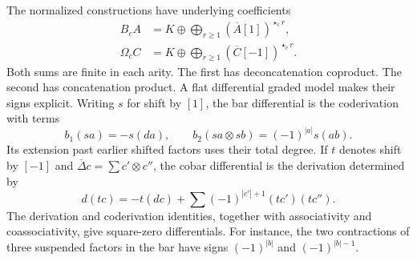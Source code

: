 The normalized constructions have underlying coefficients
\begin{align}
 B_c A&=K\oplus\bigoplus_{r\geq1}
              (\overline A[1])^{\star_c r},
              \label{eq:words-bar}\\
 \Omega_c C&=K\oplus\bigoplus_{r\geq1}
              (\overline C[-1])^{\star_c r}.
              \label{eq:words-cobar}
\end{align}
Both sums are finite in each arity.  The first has deconcatenation
coproduct.  The second has concatenation product.  A flat differential
graded model makes their signs explicit.  Writing \(s\) for shift
by \([1]\), the bar differential is the coderivation with terms
\begin{equation}
 b_1(sa)=-s(da),\qquad
 b_2(sa\otimes sb)=(-1)^{|a|}s(ab).
 \label{eq:words-bar-signs}
\end{equation}
Its extension past earlier shifted factors uses their total degree.
If \(t\) denotes shift by \([-1]\) and
\(\overline\Delta c=\sum c'\otimes c''\), the cobar differential
is the derivation determined by
\begin{equation}
 d(tc)=-t(dc)+
       \sum(-1)^{|c'|+1}(tc')(tc'').
 \label{eq:words-cobar-signs}
\end{equation}
The derivation and coderivation identities, together with
associativity and coassociativity, give square-zero differentials.
For instance, the two contractions of three suspended factors in the
bar have signs \((-1)^{|b|}\) and \((-1)^{|b|-1}\).

